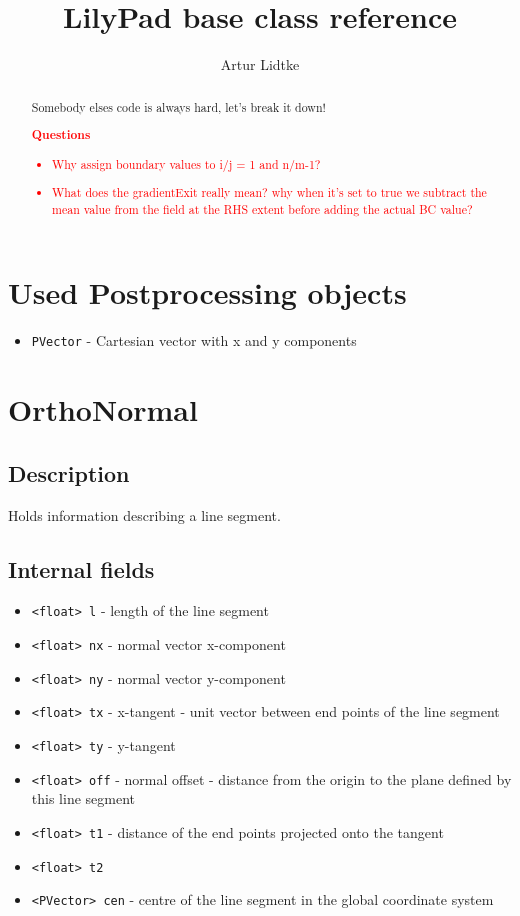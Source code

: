 \documentclass[notitlepage]{article}
\title{LilyPad base class reference}
\author{Artur Lidtke}
\begin{document}
\maketitle

\begin{abstract}
Somebody elses code is always hard, let's break it down!

\textcolor{red}
{
\textbf{Questions}
\begin{itemize}
\item Why assign boundary values to i/j = 1 and n/m-1?
\item What does the gradientExit really mean? why when it's set to true we
	subtract the mean value from the field at the RHS extent before adding the
	actual BC value?
\end{itemize}
}
\end{abstract}

\section{Used Postprocessing objects}

\begin{itemize}
\item \texttt{PVector} - Cartesian vector with x and y components
\end{itemize}

\section{OrthoNormal}

\subsection{Description}

Holds information describing a line segment.

\subsection{Internal fields}

\begin{itemize}
\item \texttt{<float> l} - length of the line segment
\item \texttt{<float> nx} - normal vector x-component
\item \texttt{<float> ny} - normal vector y-component
\item \texttt{<float> tx} - x-tangent - unit vector between end points of the line segment
\item \texttt{<float> ty} - y-tangent
\item \texttt{<float> off} - normal offset - distance from the origin to the plane defined by this line segment
\item \texttt{<float> t1} - distance of the end points projected onto the tangent
\item \texttt{<float> t2}
\item \texttt{<PVector> cen} - centre of the line segment in the global coordinate system
\end{itemize}
\end{document}
